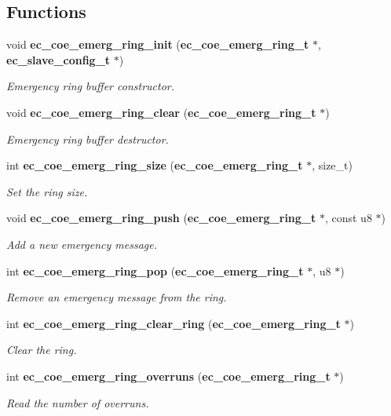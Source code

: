 \subsection*{\-Functions}
\begin{DoxyCompactItemize}
\item 
void {\bf ec\-\_\-coe\-\_\-emerg\-\_\-ring\-\_\-init} ({\bf ec\-\_\-coe\-\_\-emerg\-\_\-ring\-\_\-t} $\ast$, {\bf ec\-\_\-slave\-\_\-config\-\_\-t} $\ast$)\label{coe__emerg__ring_8h_a29d0aa3bea8dc5911ec6e90e43220fcf}

\begin{DoxyCompactList}\small\item\em \-Emergency ring buffer constructor. \end{DoxyCompactList}\item 
void {\bf ec\-\_\-coe\-\_\-emerg\-\_\-ring\-\_\-clear} ({\bf ec\-\_\-coe\-\_\-emerg\-\_\-ring\-\_\-t} $\ast$)\label{coe__emerg__ring_8h_aa2cc2988730a5be5b4501447bee6ccac}

\begin{DoxyCompactList}\small\item\em \-Emergency ring buffer destructor. \end{DoxyCompactList}\item 
int {\bf ec\-\_\-coe\-\_\-emerg\-\_\-ring\-\_\-size} ({\bf ec\-\_\-coe\-\_\-emerg\-\_\-ring\-\_\-t} $\ast$, size\-\_\-t)
\begin{DoxyCompactList}\small\item\em \-Set the ring size. \end{DoxyCompactList}\item 
void {\bf ec\-\_\-coe\-\_\-emerg\-\_\-ring\-\_\-push} ({\bf ec\-\_\-coe\-\_\-emerg\-\_\-ring\-\_\-t} $\ast$, const u8 $\ast$)\label{coe__emerg__ring_8h_a7dc4cc68ee9867298393aef837b95dce}

\begin{DoxyCompactList}\small\item\em \-Add a new emergency message. \end{DoxyCompactList}\item 
int {\bf ec\-\_\-coe\-\_\-emerg\-\_\-ring\-\_\-pop} ({\bf ec\-\_\-coe\-\_\-emerg\-\_\-ring\-\_\-t} $\ast$, u8 $\ast$)
\begin{DoxyCompactList}\small\item\em \-Remove an emergency message from the ring. \end{DoxyCompactList}\item 
int {\bf ec\-\_\-coe\-\_\-emerg\-\_\-ring\-\_\-clear\-\_\-ring} ({\bf ec\-\_\-coe\-\_\-emerg\-\_\-ring\-\_\-t} $\ast$)
\begin{DoxyCompactList}\small\item\em \-Clear the ring. \end{DoxyCompactList}\item 
int {\bf ec\-\_\-coe\-\_\-emerg\-\_\-ring\-\_\-overruns} ({\bf ec\-\_\-coe\-\_\-emerg\-\_\-ring\-\_\-t} $\ast$)
\begin{DoxyCompactList}\small\item\em \-Read the number of overruns. \end{DoxyCompactList}\end{DoxyCompactItemize}


